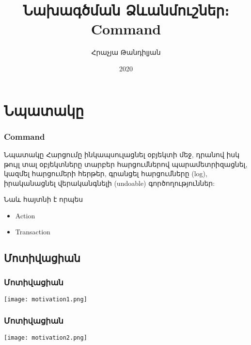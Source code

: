 \documentclass{beamer}
\begin{document}
\title[Command]{Նախագծման Ձևանմուշներ։ Command}
\author[Հրաչյա Թանդիլյան\copyright]{Հրաչյա Թանդիլյան}
\date{2020}

\begin{frame}
\titlepage
\end{frame}

\section{Նպատակը}
\begin{frame}\frametitle{Command}
\begin{block}{Նպատակը}
    Հարցումը ինկապսուլացնել օբյեկտի մեջ, դրանով իսկ թույլ տալ օբյեկտները տարբեր
    հարցումներով պարամետրիզացնել, կազմել հարցումերի հերթեր, գրանցել հարցումները (log),
    իրականացնել վերականգնելի (undoable) գործողություններ:
\end{block}
\vfill
Նաև հայտնի է որպես
\begin{itemize}
    \item Action
    \item Transaction
\end{itemize}
\end{frame}

\subsection{Մոտիվացիան}
\begin{frame}\frametitle{Մոտիվացիան}
\begin{center}
    \texttt{[image: motivation1.png]}
\end{center}
\end{frame}

\begin{frame}\frametitle{Մոտիվացիան}
\begin{center}
    \texttt{[image: motivation2.png]}
\end{center}
\end{frame}
\end{document}
